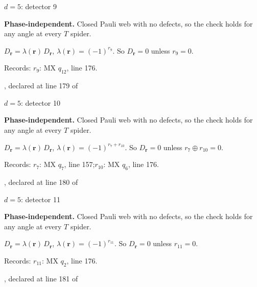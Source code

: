 \label{d5_det009}
{\Large $d=5$: detector 9}\par
\textbf{Phase-independent.} Closed Pauli web with no defects, so the check holds for any angle at every $T$ spider.
\begin{center}
\end{center}
\vspace{-1mm}
$D_{\boldsymbol r}=\lambda(\boldsymbol r)\,D_{\boldsymbol r}$, \quad $\lambda(\boldsymbol r)=(-1)^{r_{9}}$. \qquad So $D_{\boldsymbol r}=0$ unless $r_{9}=0$.
\par\smallskip\begin{minipage}{.98\linewidth}\small Records: $r_{9}$: MX $q_{12}$, line 176.\end{minipage}
\vfill
{\footnotesize\texttt{}, declared at line 179 of \texttt{}}
\newpage

\label{d5_det010}
{\Large $d=5$: detector 10}\par
\textbf{Phase-independent.} Closed Pauli web with no defects, so the check holds for any angle at every $T$ spider.
\begin{center}
\end{center}
\vspace{-1mm}
$D_{\boldsymbol r}=\lambda(\boldsymbol r)\,D_{\boldsymbol r}$, \quad $\lambda(\boldsymbol r)=(-1)^{r_{7}+r_{10}}$. \qquad So $D_{\boldsymbol r}=0$ unless $r_{7}\oplus r_{10}=0$.
\par\smallskip\begin{minipage}{.98\linewidth}\small Records: $r_{7}$: MX $q_{7}$, line 157;\quad $r_{10}$: MX $q_{6}$, line 176.\end{minipage}
\vfill
{\footnotesize\texttt{}, declared at line 180 of \texttt{}}
\newpage

\label{d5_det011}
{\Large $d=5$: detector 11}\par
\textbf{Phase-independent.} Closed Pauli web with no defects, so the check holds for any angle at every $T$ spider.
\begin{center}
\end{center}
\vspace{-1mm}
$D_{\boldsymbol r}=\lambda(\boldsymbol r)\,D_{\boldsymbol r}$, \quad $\lambda(\boldsymbol r)=(-1)^{r_{11}}$. \qquad So $D_{\boldsymbol r}=0$ unless $r_{11}=0$.
\par\smallskip\begin{minipage}{.98\linewidth}\small Records: $r_{11}$: MX $q_{2}$, line 176.\end{minipage}
\vfill
{\footnotesize\texttt{}, declared at line 181 of \texttt{}}
\newpage

